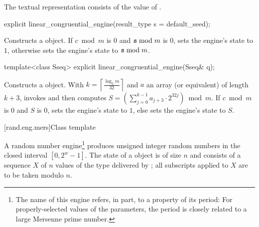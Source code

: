 \pnum The textual representation%
consists of
the value of .

%
\begin{itemdecl}
explicit linear_congruential_engine(result_type s = default_seed);
\end{itemdecl}

\begin{itemdescr}
\pnum\effects Constructs a  object.
 If $ c \bmod m $ is $0$ and $ \texttt{s} \bmod m $ is $0$,
 sets the engine's state to $1$,
 otherwise sets the engine's state to $\texttt{s} \bmod m$.
\end{itemdescr}

%
\begin{itemdecl}
template<class Sseq> explicit linear_congruential_engine(Sseq& q);
\end{itemdecl}

\begin{itemdescr}
\pnum\effects Constructs a  object.
 With
 $ k = \left\lceil \frac{\log_2 m}
                        {32}
            \right\rceil
 $
 and $a$ an array (or equivalent)
 of length $k + 3$,
 invokes 
 and then computes
 $ S = \left(\sum_{j=0}^{k-1}a_{j+3} \cdot 2^{32j} \right) \bmod m $.
 If
   $ c \bmod m $ is $0$
 and
   $S$ is $0$,
 sets the engine's state to $1$,
 else sets the engine's state
 to $S$.
\end{itemdescr}


[rand.eng.mers]{Class template }%
%

\pnum
A  random number
engine\footnote{The name of this engine refers, in part, to a property of its period:
 For properly-selected values of the parameters,
 the period is closely related to a large Mersenne prime number.}
produces unsigned integer random numbers
in the closed interval $[0,2^w-1]$.
The
%
%
state
of a  object 
is of size $n$
and consists of a sequence $X$
of $n$ values of the type delivered by ;
all subscripts applied to $X$ are to be taken modulo $n$.

